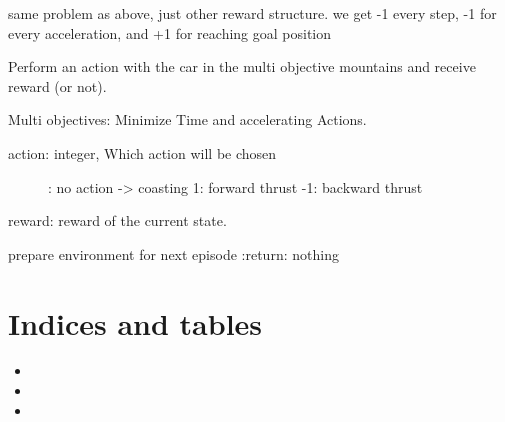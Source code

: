 \documentclass[letterpaper,10pt,english]{sphinxmanual}
\begin{document}
\begin{fulllineitems}
\label{Problems:morl_problems.MountainCarTime}
same problem as above, just other reward structure. we get -1 every step,
-1 for every acceleration, and +1 for reaching goal position

\begin{fulllineitems}
\label{Problems:morl_problems.MountainCarTime.play}
Perform an action with the car in the
multi objective mountains and receive reward (or not).

Multi objectives: Minimize Time and accelerating Actions.
\begin{description}
\item[{action: integer, Which action will be chosen}] : no action -\textgreater{} coasting
1: forward thrust
-1: backward thrust

\end{description}

reward: reward of the current state.

\end{fulllineitems}


\begin{fulllineitems}
\label{Problems:morl_problems.MountainCarTime.reset}
prepare environment for next episode
:return: nothing

\end{fulllineitems}


\end{fulllineitems}



\chapter{Indices and tables}
\label{index:indices-and-tables}\begin{itemize}
\item {} 

\item {} 

\item {} 

\end{itemize}
\end{document}
